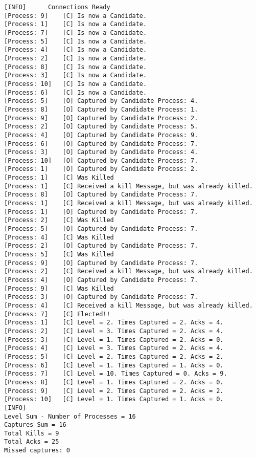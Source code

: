 \begin{Verbatim}[frame=single,label=Test 4 output]
[INFO]	  	Connections Ready
[Process: 9]	[C]	Is now a Candidate.
[Process: 1]	[C]	Is now a Candidate.
[Process: 7]	[C]	Is now a Candidate.
[Process: 5]	[C]	Is now a Candidate.
[Process: 4]	[C]	Is now a Candidate.
[Process: 2]	[C]	Is now a Candidate.
[Process: 8]	[C]	Is now a Candidate.
[Process: 3]	[C]	Is now a Candidate.
[Process: 10]	[C]	Is now a Candidate.
[Process: 6]	[C]	Is now a Candidate.
[Process: 5]	[O]	Captured by Candidate Process: 4.
[Process: 8]	[O]	Captured by Candidate Process: 1.
[Process: 9]	[O]	Captured by Candidate Process: 2.
[Process: 2]	[O]	Captured by Candidate Process: 5.
[Process: 4]	[O]	Captured by Candidate Process: 9.
[Process: 6]	[O]	Captured by Candidate Process: 7.
[Process: 3]	[O]	Captured by Candidate Process: 4.
[Process: 10]	[O]	Captured by Candidate Process: 7.
[Process: 1]	[O]	Captured by Candidate Process: 2.
[Process: 1]	[C]	Was Killed
[Process: 1]	[C]	Received a kill Message, but was already killed.
[Process: 8]	[O]	Captured by Candidate Process: 7.
[Process: 1]	[C]	Received a kill Message, but was already killed.
[Process: 1]	[O]	Captured by Candidate Process: 7.
[Process: 2]	[C]	Was Killed
[Process: 5]	[O]	Captured by Candidate Process: 7.
[Process: 4]	[C]	Was Killed
[Process: 2]	[O]	Captured by Candidate Process: 7.
[Process: 5]	[C]	Was Killed
[Process: 9]	[O]	Captured by Candidate Process: 7.
[Process: 2]	[C]	Received a kill Message, but was already killed.
[Process: 4]	[O]	Captured by Candidate Process: 7.
[Process: 9]	[C]	Was Killed
[Process: 3]	[O]	Captured by Candidate Process: 7.
[Process: 4]	[C]	Received a kill Message, but was already killed.
[Process: 7]	[C]	Elected!! 
[Process: 1]	[C]	Level = 2. Times Captured = 2. Acks = 4.
[Process: 2]	[C]	Level = 3. Times Captured = 2. Acks = 4.
[Process: 3]	[C]	Level = 1. Times Captured = 2. Acks = 0.
[Process: 4]	[C]	Level = 3. Times Captured = 2. Acks = 4.
[Process: 5]	[C]	Level = 2. Times Captured = 2. Acks = 2.
[Process: 6]	[C]	Level = 1. Times Captured = 1. Acks = 0.
[Process: 7]	[C]	Level = 10. Times Captured = 0. Acks = 9.
[Process: 8]	[C]	Level = 1. Times Captured = 2. Acks = 0.
[Process: 9]	[C]	Level = 2. Times Captured = 2. Acks = 2.
[Process: 10]	[C]	Level = 1. Times Captured = 1. Acks = 0.
[INFO]		
Level Sum - Number of Processes = 16	
Captures Sum = 16
Total Kills = 9	
Total Acks = 25
Missed captures: 0
\end{Verbatim}




